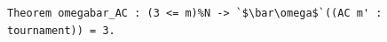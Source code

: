 \begin{lstlisting}[language=Rocq]
Theorem omegabar_AC : (3 <= m)%N -> `$\bar\omega$`((AC m' : tournament)) = 3.
\end{lstlisting}
